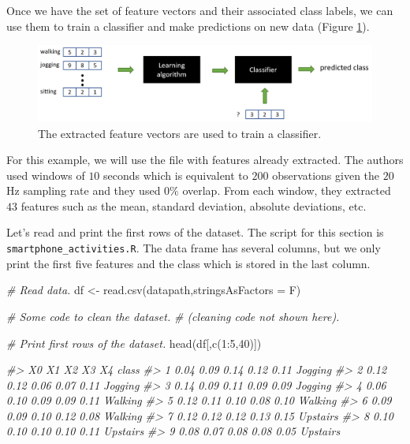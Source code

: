 \documentclass[
  11pt,
]{krantz}
\newenvironment{Shaded}{\begin{snugshade}}{\end{snugshade}}
\newcommand{\AttributeTok}[1]{\textcolor[rgb]{0.61,0.61,0.61}{#1}}
\newcommand{\CommentTok}[1]{\textcolor[rgb]{0.37,0.37,0.37}{\textit{#1}}}
\newcommand{\DecValTok}[1]{\textcolor[rgb]{0.06,0.06,0.06}{#1}}
\newcommand{\FunctionTok}[1]{\textcolor[rgb]{0,0,0}{#1}}
\newcommand{\NormalTok}[1]{#1}
\newcommand{\OtherTok}[1]{\textcolor[rgb]{0.37,0.37,0.37}{#1}}
\newcommand{\SpecialCharTok}[1]{\textcolor[rgb]{0,0,0}{#1}}
\begin{document}
Once we have the set of feature vectors and their associated class labels, we can use them to train a classifier and make predictions on new data (Figure \ref{fig:extractedFeatureVectors}).

\begin{figure}

{\centering \includegraphics[width=0.9\linewidth]{images/activitiesPrediction} 

}

\caption{The extracted feature vectors are used to train a classifier.}\label{fig:extractedFeatureVectors}
\end{figure}

For this example, we will use the file with features already extracted. The authors used windows of \(10\) seconds which is equivalent to \(200\) observations given the \(20\) Hz sampling rate and they used \(0\%\) overlap. From each window, they extracted \(43\) features such as the mean, standard deviation, absolute deviations, etc.

Let's read and print the first rows of the dataset. The script for this section is \texttt{smartphone\_activities.R}. The data frame has several columns, but we only print the first five features and the class which is stored in the last column.

\begin{Shaded}
\begin{Highlighting}[]
\CommentTok{\# Read data.}
\NormalTok{df }\OtherTok{\textless{}{-}} \FunctionTok{read.csv}\NormalTok{(datapath,}\AttributeTok{stringsAsFactors =}\NormalTok{ F)}

\CommentTok{\# Some code to clean the dataset.}
\CommentTok{\# (cleaning code not shown here).}

\CommentTok{\# Print first rows of the dataset.}
\FunctionTok{head}\NormalTok{(df[,}\FunctionTok{c}\NormalTok{(}\DecValTok{1}\SpecialCharTok{:}\DecValTok{5}\NormalTok{,}\DecValTok{40}\NormalTok{)])}

\CommentTok{\#\textgreater{}     X0   X1   X2   X3   X4    class}
\CommentTok{\#\textgreater{} 1 0.04 0.09 0.14 0.12 0.11  Jogging}
\CommentTok{\#\textgreater{} 2 0.12 0.12 0.06 0.07 0.11  Jogging}
\CommentTok{\#\textgreater{} 3 0.14 0.09 0.11 0.09 0.09  Jogging}
\CommentTok{\#\textgreater{} 4 0.06 0.10 0.09 0.09 0.11  Walking}
\CommentTok{\#\textgreater{} 5 0.12 0.11 0.10 0.08 0.10  Walking}
\CommentTok{\#\textgreater{} 6 0.09 0.09 0.10 0.12 0.08  Walking}
\CommentTok{\#\textgreater{} 7 0.12 0.12 0.12 0.13 0.15 Upstairs}
\CommentTok{\#\textgreater{} 8 0.10 0.10 0.10 0.10 0.11 Upstairs}
\CommentTok{\#\textgreater{} 9 0.08 0.07 0.08 0.08 0.05 Upstairs}
\end{Highlighting}
\end{Shaded}
\end{document}
